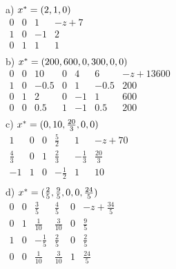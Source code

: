 \begin{enumerate}
    \begin{solution}
      a) $x^* = (2,1,0)$ \\
      \newline
      $\begin{array}
      {ccc|l}
      0 & 0 & 1 & -z+7\\ \hline
      1 & 0 & -1 & 2 \\
      0 & 1 & 1 & 1
      \\\end{array}$ \\
      \newline
      \newline
      b) $ x^* = (200,600,0,300,0,0)$ \\
      \newline
      $\begin{array}
      {cccccc|l}
      0 & 0 & 10 & 0 & 4 & 6 & -z + 13600 \\  \hline
      1 & 0 & -0.5 & 0 & 1 & -0.5 & 200 \\
      0 & 1 & 2 & 0 & -1 & 1 & 600 \\
      0 & 0 & 0.5 & 1 & -1 & 0.5 & 200
      \\\end{array}$\\
      \newline
      \newline
      c) $x^* = (0,10,\frac{20}{3}, 0,0)$ \\
      \newline
      $\begin{array}
      {ccccc|l}
      1 & 0 & 0 & \frac{5}{2} & 1 & -z +70 \\ \hline
      \frac{4}{3} & 0 & 1 & \frac{2}{3} & -\frac{1}{3} & \frac{20}{3} \\
      -1 & 1 & 0 & - \frac{1}{2} & 1 & 10
      \\\end{array}$\\
      \newline
      \newline
      d) $x^* = (\frac{2}{5}, \frac{9}{5}, 0,0,\frac{24}{5})$ \\
      \newline
      $\begin{array}
      {ccccc|l}
      0 & 0 & \frac{3}{5} & \frac{4}{5} & 0 & - z + \frac{34}{5} \\ \hline
      0 & 1 & \frac{1}{10} & \frac{3}{10} & 0 & \frac{9}{5} \\
      1 & 0 & -\frac{1}{5} & \frac{2}{5} & 0 & \frac{2}{5} \\
      0 & 0 & \frac{1}{10} & \frac{3}{10} & 1 & \frac{24}{5}
      \\\end{array}$\\
      \newline
      \newline
    \end{solution}


\end{enumerate}
